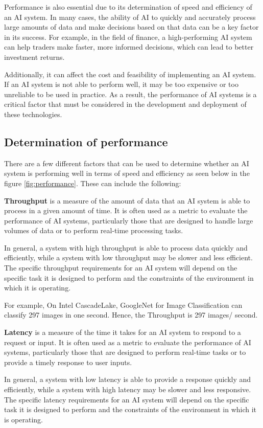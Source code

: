 Performance is also essential due to its determination of speed and efficiency of an AI 
system. In many cases, the ability of AI to quickly and accurately process large amounts 
of data and make decisions based on that data can be a key factor in its success. For example, 
in the field of finance, a high-performing AI system can help traders make faster, more informed
decisions, which can lead to better investment returns.

Additionally, it can affect the cost and feasibility of implementing an AI system. 
If an AI system is not able to perform well, it may be too expensive or too unreliable 
to be used in practice. As a result, the performance of AI systems is a critical factor 
that must be considered in the development and deployment of these technologies.

\subsection{Determination of performance}
There are a few different factors that can be used to determine
whether an AI system is performing well in terms of speed and efficiency as seen below in the figure \ref{fig:performance}.
These can include the following:

\textbf{Throughput} is a measure of the amount of data that an AI system is able to process in a given amount of time.
It is often used as a metric to evaluate the performance of AI systems, particularly those that are designed
to handle large volumes of data or to perform real-time processing tasks.

In general, a system with high throughput is able to process data quickly and efficiently,
while a system with low throughput may be slower and less efficient. The specific throughput
requirements for an AI system will depend on the specific task it is designed to perform and the
constraints of the environment in which it is operating.

For example, On Intel CascadeLake, GoogleNet for Image Classification can classify 297 images in one second. 
Hence, the Throughput is 297 images/ second. \cite{throughput}

\textbf{Latency} is a measure of the time it takes for an AI system to respond to a request or input.
It is often used as a metric to evaluate the performance of AI systems, particularly those that 
are designed to perform real-time tasks or to provide a timely response to user inputs.

In general, a system with low latency is able to provide a response quickly and efficiently, 
while a system with high latency may be slower and less responsive. The specific latency requirements 
for an AI system will depend on the specific task it is designed to perform and the constraints of the 
environment in which it is operating.


